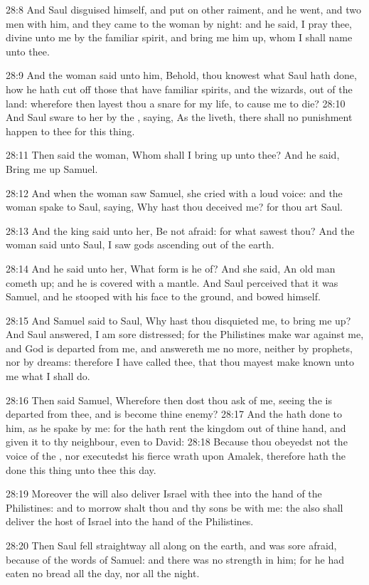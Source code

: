 28:8 And Saul disguised himself, and put on other raiment, and he went, and two men with him, and they came to the woman by night: and he said, I pray thee, divine unto me by the familiar spirit, and bring me him up, whom I shall name unto thee.

28:9 And the woman said unto him, Behold, thou knowest what Saul hath done, how he hath cut off those that have familiar spirits, and the wizards, out of the land: wherefore then layest thou a snare for my life, to cause me to die?  28:10 And Saul sware to her by the \LORD, saying, As the \LORD liveth, there shall no punishment happen to thee for this thing.

28:11 Then said the woman, Whom shall I bring up unto thee? And he said, Bring me up Samuel.

28:12 And when the woman saw Samuel, she cried with a loud voice: and the woman spake to Saul, saying, Why hast thou deceived me? for thou art Saul.

28:13 And the king said unto her, Be not afraid: for what sawest thou?  And the woman said unto Saul, I saw gods ascending out of the earth.

28:14 And he said unto her, What form is he of? And she said, An old man cometh up; and he is covered with a mantle. And Saul perceived that it was Samuel, and he stooped with his face to the ground, and bowed himself.

28:15 And Samuel said to Saul, Why hast thou disquieted me, to bring me up? And Saul answered, I am sore distressed; for the Philistines make war against me, and God is departed from me, and answereth me no more, neither by prophets, nor by dreams: therefore I have called thee, that thou mayest make known unto me what I shall do.

28:16 Then said Samuel, Wherefore then dost thou ask of me, seeing the \LORD is departed from thee, and is become thine enemy?  28:17 And the \LORD hath done to him, as he spake by me: for the \LORD hath rent the kingdom out of thine hand, and given it to thy neighbour, even to David: 28:18 Because thou obeyedst not the voice of the \LORD, nor executedst his fierce wrath upon Amalek, therefore hath the \LORD done this thing unto thee this day.

28:19 Moreover the \LORD will also deliver Israel with thee into the hand of the Philistines: and to morrow shalt thou and thy sons be with me: the \LORD also shall deliver the host of Israel into the hand of the Philistines.

28:20 Then Saul fell straightway all along on the earth, and was sore afraid, because of the words of Samuel: and there was no strength in him; for he had eaten no bread all the day, nor all the night.

